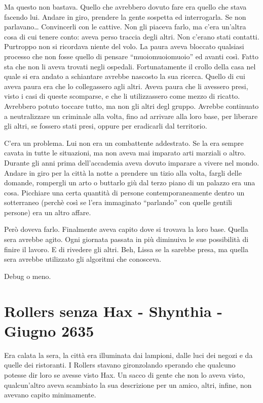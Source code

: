     Ma questo non
    bastava. Quello che avrebbero dovuto fare era quello che stava facendo
    lui. Andare in giro, prendere la gente sospetta ed interrogarla. Se non
    parlavano\dots{} Convincerli con le cattive. Non gli piaceva farlo, ma
    c'era un'altra cosa di cui tenere conto: aveva perso traccia degli
    altri. Non c'erano stati contatti. Purtroppo non si ricordava niente
    del volo. La paura aveva bloccato qualsiasi processo che non fosse
    quello di pensare ``muoiomuoiomuoio'' ed avanti così. Fatto sta che non
    li aveva trovati negli ospedali.
    Fortunatamente il crollo della casa nel quale si era andato a
    schiantare avrebbe nascosto la sua ricerca. Quello di cui aveva paura
    era che lo collegassero agli altri. Aveva paura che li avessero presi,
    visto i casi di queste scomparse, e che li utilizzassero come mezzo di
    ricatto. Avrebbero potuto toccare tutto, ma non gli altri degl gruppo.
    Avrebbe continuato a neutralizzare un criminale alla volta, fino ad
    arrivare alla loro base, per liberare gli altri, se fossero stati
    presi, oppure per eradicarli dal territorio.

    C'era un problema. Lui non era un combattente addestrato. Se la era
    sempre cavata in tutte le situazioni, ma non aveva mai imparato arti
    marziali o altro. Durante gli anni prima dell'accademia aveva dovuto
    imparare a vivere nel mondo. Andare in giro per la città la notte a
    prendere un tizio alla volta, fargli delle domande, rompergli un arto o
    buttarlo giù dal terzo piano di un palazzo era una cosa. Picchiare una
    certa quantità di persone contemporaneamente dentro un sotterraneo
    (perchè così se l'era immaginato ``parlando'' con quelle gentili
    persone) era un altro affare.

    Però doveva farlo. Finalmente aveva capito dove si trovava la loro
    base. Quella sera avrebbe agito. Ogni giornata passata in più diminuiva le
    sue possibilità di finire il lavoro. E di rivedere gli altri. Beh,
    Lissa se la sarebbe presa, ma quella sera avrebbe utilizzato gli
    algoritmi che conosceva.

    Debug o meno.

    \section{Rollers senza Hax - Shynthia - Giugno 2635}
    Era calata la sera, la città era illuminata dai lampioni, dalle luci
    dei negozi e da quelle dei ristoranti. I Rollers stavano gironzolando
    sperando che qualcuno potesse dir loro se avesse visto Hax. Un sacco di
    gente che non lo aveva visto, qualcun'altro aveva scambiato la sua
    descrizione per un amico, altri, infine, non avevano capito
    minimamente.

